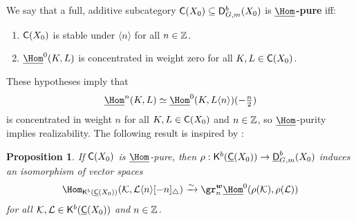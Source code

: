 \documentclass[a4paper,10pt,leqno]{amsart}
\theoremstyle{plain}
\theoremstyle{plain}
\theoremstyle{plain}
\newtheorem{prop}[thm]{Proposition}
\theoremstyle{definition}
\theoremstyle{remark}
\newcommand{\dfemph}[1]{\textbf{#1}}
\begin{document}
\subsection{}

We say that a full, additive subcategory $\sf{C}(X_0) \subseteq \sf{D}_{G, m}^b(X_0)$ is \dfemph{$\SHom$-pure} iff:
\begin{enumerate}
\item
 	$\sf{C}(X_0)$ is stable under $\langle n\rangle$ for all $n \in \bb{Z}$.
\item
 	$\SHom^0(K, L)$ is concentrated in weight zero for all $K, L \in \sf{C}(X_0)$.
\end{enumerate}
These hypotheses imply that 
\begin{align}
\SHom^n(K, L) \simeq \SHom^0(K, L\langle n\rangle)(-\tfrac{n}{2})
\end{align}
is concentrated in weight $n$ for all $K, L \in \sf{C}(X_0)$ and $n \in \bb{Z}$, so $\SHom$-purity implies realizability.
The following result is inspired by \cite[Thm.\ 4.3]{rider}:

\begin{prop}\label{prop:realization}
If $\sf{C}(X_0)$ is $\SHom$-pure, then $\rho : \sf{K}^b(\underline{\sf{C}}(X_0)) \to \underline{\sf{D}}_{G, m}^b(X_0)$ induces an isomorphism of vector spaces
\begin{align}\label{eq:realization}
\Hom_{\sf{K}^b(\underline{\sf{C}}(X_0))}(\cal{K}, \cal{L}\langle n\rangle [-n]_\triangle)
\xrightarrow{\sim}
\gr_n^{\bm{w}} \SHom^0(\rho(\cal{K}), \rho(\cal{L}))
\end{align}
for all $\cal{K}, \cal{L} \in \sf{K}^b(\underline{\sf{C}}(X_0))$ and $n \in \bb{Z}$.
\end{prop}
\end{document}
